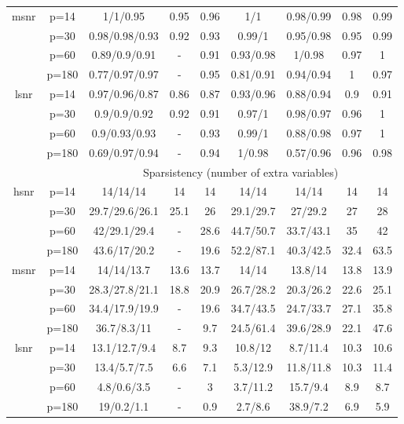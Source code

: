 \begin{table}[ht]
{\begin{tabular}{|c|c|ccccccc|}
  \midrule\multirow{4}[2]{*}{msnr} & p=14 & 1/1/0.95 & 0.95 & 0.96 & 1/1 & 0.98/0.99 & 0.98 & 0.99 \\ 
   & p=30 & 0.98/0.98/0.93 & 0.92 & 0.93 & 0.99/1 & 0.95/0.98 & 0.95 & 0.99 \\ 
   & p=60 & 0.89/0.9/0.91 & - & 0.91 & 0.93/0.98 & 1/0.98 & 0.97 & 1 \\ 
   & p=180 & 0.77/0.97/0.97 & - & 0.95 & 0.81/0.91 & 0.94/0.94 & 1 & 0.97 \\ 
  \midrule\multirow{4}[2]{*}{lsnr} & p=14 & 0.97/0.96/0.87 & 0.86 & 0.87 & 0.93/0.96 & 0.88/0.94 & 0.9 & 0.91 \\ 
   & p=30 & 0.9/0.9/0.92 & 0.92 & 0.91 & 0.97/1 & 0.98/0.97 & 0.96 & 1 \\ 
   & p=60 & 0.9/0.93/0.93 & - & 0.93 & 0.99/1 & 0.88/0.98 & 0.97 & 1 \\ 
   & p=180 & 0.69/0.97/0.94 & - & 0.94 & 1/0.98 & 0.57/0.96 & 0.96 & 0.98 \\ 
   \midrule 
 \multicolumn{1}{|c}{} &       & \multicolumn{7}{c|}{Sparsistency (number of extra variables)} \\
\midrule\multirow{4}[2]{*}{hsnr} & p=14 & 14/14/14 & 14 & 14 & 14/14 & 14/14 & 14 & 14 \\ 
   & p=30 & 29.7/29.6/26.1 & 25.1 & 26 & 29.1/29.7 & 27/29.2 & 27 & 28 \\ 
   & p=60 & 42/29.1/29.4 & - & 28.6 & 44.7/50.7 & 33.7/43.1 & 35 & 42 \\ 
   & p=180 & 43.6/17/20.2 & - & 19.6 & 52.2/87.1 & 40.3/42.5 & 32.4 & 63.5 \\ 
  \midrule\multirow{4}[2]{*}{msnr} & p=14 & 14/14/13.7 & 13.6 & 13.7 & 14/14 & 13.8/14 & 13.8 & 13.9 \\ 
   & p=30 & 28.3/27.8/21.1 & 18.8 & 20.9 & 26.7/28.2 & 20.3/26.2 & 22.6 & 25.1 \\ 
   & p=60 & 34.4/17.9/19.9 & - & 19.6 & 34.7/43.5 & 24.7/33.7 & 27.1 & 35.8 \\ 
   & p=180 & 36.7/8.3/11 & - & 9.7 & 24.5/61.4 & 39.6/28.9 & 22.1 & 47.6 \\ 
  \midrule\multirow{4}[2]{*}{lsnr} & p=14 & 13.1/12.7/9.4 & 8.7 & 9.3 & 10.8/12 & 8.7/11.4 & 10.3 & 10.6 \\ 
   & p=30 & 13.4/5.7/7.5 & 6.6 & 7.1 & 5.3/12.9 & 11.8/11.8 & 10.3 & 11.4 \\ 
   & p=60 & 4.8/0.6/3.5 & - & 3 & 3.7/11.2 & 15.7/9.4 & 8.9 & 8.7 \\ 
   & p=180 & 19/0.2/1.1 & - & 0.9 & 2.7/8.6 & 38.9/7.2 & 6.9 & 5.9 \\ 
   \bottomrule 
\end{tabular}
}
\end{table}
